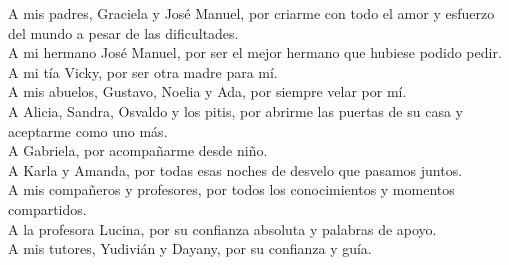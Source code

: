 \begin{acknowledgements}
    A mis padres, Graciela y Jos\'e Manuel, por criarme con
    todo el amor y esfuerzo del mundo a pesar de las dificultades.\\
    
    A mi hermano Jos\'e Manuel, por ser el mejor hermano
    que hubiese podido pedir.\\

    A mi t\'ia Vicky, por ser otra madre para m\'i.\\

    A mis abuelos, Gustavo, Noelia y Ada, por siempre velar por m\'i.\\
    
    A Alicia, Sandra, Osvaldo y los pitis, por abrirme las puertas de su casa
    y aceptarme como uno m\'as.\\

    A Gabriela, por acompa\~narme desde ni\~no.\\

    A Karla y Amanda, por todas esas noches de desvelo que pasamos juntos.\\

    A mis compa\~neros y profesores, por todos los conocimientos y momentos compartidos.\\

    A la profesora Lucina, por su confianza absoluta y palabras de apoyo.\\

    A mis tutores, Yudivi\'an y Dayany, por su confianza y gu\'ia.\\
    

\end{acknowledgements}
